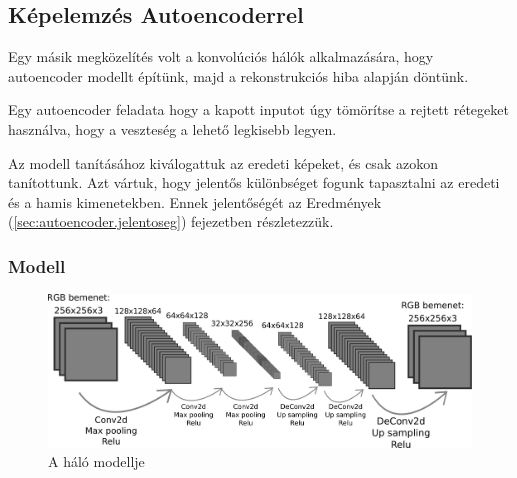 %
%
%
%
%
%
%
%
%





\subsection{Képelemzés Autoencoderrel}
\label{sec:autoencoder}

Egy másik megközelítés volt a konvolúciós hálók alkalmazására, hogy autoencoder modellt 
építünk, majd a rekonstrukciós hiba alapján döntünk.

Egy autoencoder feladata hogy a kapott inputot úgy tömörítse a rejtett rétegeket
használva, hogy a veszteség a lehető legkisebb legyen.

Az modell tanításához kiválogattuk az eredeti képeket, és csak azokon tanítottunk.
Azt vártuk, hogy jelentős különbséget fogunk tapasztalni az eredeti és a hamis 
kimenetekben. Ennek jelentőségét az Eredmények (\ref{sec:autoencoder.jelentoseg}) fejezetben részletezzük. 


\subsubsection{Modell}




\begin{figure} [h!]
	\label{fig:autoencoder-halo-modell}
	\centering
	\includegraphics[scale=0.3]{img/autoencoder-network-modell.pdf}
	\caption{A háló modellje}
\end{figure}



